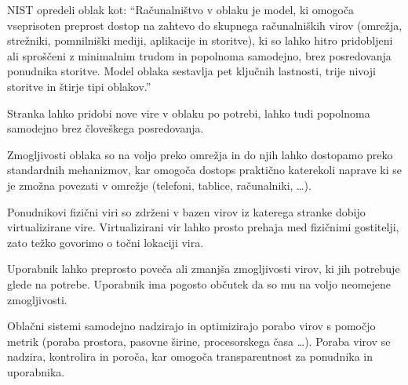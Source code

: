 \documentclass[12pt,a4paper,openany]{book}
\begin{document}
NIST opredeli oblak kot: “Računalništvo v oblaku je model, ki omogoča vseprisoten preprost dostop na zahtevo do skupnega računalniških virov (omrežja, strežniki, pomnilniški mediji, aplikacije in storitve), ki so lahko hitro pridobljeni ali sproščeni z minimalnim trudom in popolnoma samodejno, brez posredovanja ponudnika storitve. Model oblaka sestavlja pet ključnih lastnosti, trije nivoji storitve in štirje tipi oblakov.”

\begin{description}[style=nextline]
   \item[Storitev na zahtevo] Stranka lahko pridobi nove vire v oblaku po potrebi, lahko tudi popolnoma samodejno brez človeškega posredovanja.

   \item[Širok dostop preko omrežja] Zmogljivosti oblaka so na voljo preko omrežja in do njih lahko dostopamo preko standardnih mehanizmov, kar omogoča dostops praktično katerekoli naprave ki se je zmožna povezati v omrežje (telefoni, tablice, računalniki, …).

   \item[Uporaba skupnih virov] Ponudnikovi fizični viri so zdrženi v bazen virov iz katerega stranke dobijo virtualizirane vire. Virtualizirani vir lahko prosto prehaja med fizičnimi gostitelji, zato težko govorimo o točni lokaciji vira.

   \item[Bliskovita prožnost] Uporabnik lahko preprosto poveča ali zmanjša zmogljivosti virov, ki jih potrebuje glede na potrebe. Uporabnik ima pogosto občutek da so mu na voljo neomejene zmogljivosti.

   \item[Merjenje porabe in obračun glede na porabo virov]  Oblačni sistemi samodejno nadzirajo in optimizirajo porabo virov s pomočjo metrik (poraba prostora, pasovne širine, procesorskega časa …). Poraba virov se nadzira, kontrolira in poroča, kar omogoča transparentnost za ponudnika in uporabnika.
\end{description}

\end{document}
